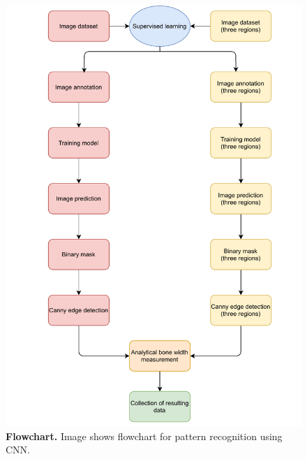 \begin{figure}[!ht]
    \centering
    \includegraphics[width=.66\textwidth]{obrazky-figures/successful.pdf}
    \caption{\textbf{Flowchart.} Image shows flowchart for pattern recognition using CNN.}
    \label{flowchart2}
\end{figure}

